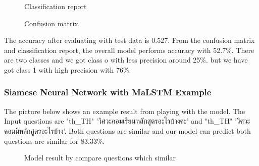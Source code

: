 \documentclass[12pt,oneside,openright,a4paper]{cpe-english-project}
\begin{document}
\begin{figure}[!h]\centering
{}
\caption{Classification report}\label{fig:Classification report}
\end{figure}
\begin{figure}[!h]\centering
{}
\caption{Confusion matrix}\label{fig:Confusion matrix}
\end{figure}

The accuracy after evaluating with test data is 0.527. From the confusion matrix and classification report, the overall model performs accuracy with 52.7\%. There are two classes and we got class o with less precision around 25\%. but we have got class 1 with high precision with 76\%.

\subsubsection{Siamese Neural Network with MaLSTM Example}

The picture below shows an example result from playing with the model. The Input questions are
{
\XeTeXlinebreaklocale "th_TH"	
\thaifont 
'วิศวะคอมเรียนหลักสูตรอะไรบ้างคะ' }
and
{
\XeTeXlinebreaklocale "th_TH"	
\thaifont 
 'วิศวะคอมมีหลักสูตรอะไรบ้าง'. 
}Both questions are similar and our model can predict both questions are similar for 83.33\%.

\begin{figure}[!h]\centering
{}
\caption{Model result by compare questions which similar}\label{fig:Model result by compare questions which similar}
\end{figure}
\end{document}
